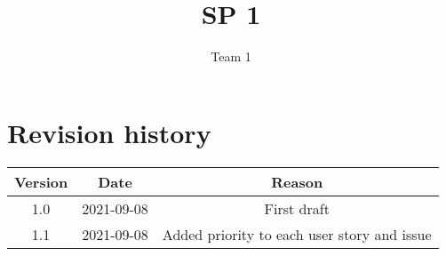 \documentclass{article}
\title{SP 1}
\author{Team 1}
\begin{document}
\date{}
\maketitle
\thispagestyle{fancy}

\section*{Revision history}
\begin{tabular}{ |c|c|c| } 
 \hline
 Version & Date & Reason \\ \hline
 1.0 & 2021-09-08 & First draft \\ 
\hline
1.1 & 2021-09-08 & Added priority to each user story and issue \\ 
 \hline
\end{tabular}

\newpage
\end{document}
